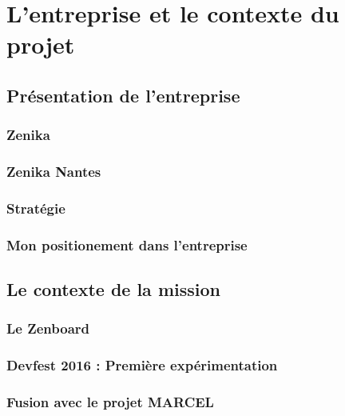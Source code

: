 \documentclass[twoside, 12pt]{report}
\begin{document}
\part{L'entreprise et le contexte du projet}

    \chapter{Présentation de l'entreprise}
        

        \section{Zenika}
            

        \section{Zenika Nantes}
            

        \section{Stratégie}
            

        \section{Mon positionement dans l'entreprise}
        	

    \chapter{Le contexte de la mission}
        

        \section{Le Zenboard}

        \section{Devfest 2016 : Première expérimentation }
            

        \section{Fusion avec le projet MARCEL}
            
\end{document}
